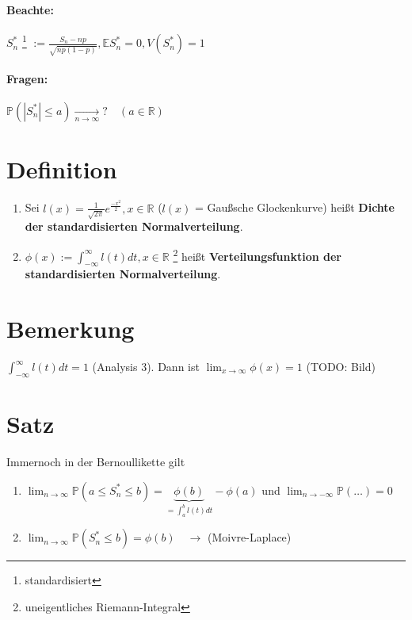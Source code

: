 \documentclass[a4paper,11pt,notitlepage]{report}
\newcommand{\R}{{\ensuremath{\mathbb{R}}}}
\newcommand{\Prim}{{\ensuremath{\mathbb{P}}}}
\newcommand{\E}{{\ensuremath{\mathbb{E}}}}
\begin{document}
\paragraph{Beachte:}
$S_n^*$ \footnote{standardisiert} $:= \frac{S_n - np}{\sqrt{n p (1-p)}}, \E S_n^* = 0, V(S_n^*) = 1$

\paragraph{Fragen:}
$\Prim(|S_n^*| \leq a) \underset{n \rightarrow \infty}{\rightarrow} ? \quad (a \in \R)$

\section{Definition}
\begin{enumerate}
	\item Sei $l(x) = \frac{1}{\sqrt{2 \pi}} e^{\frac{-x^2}{2}}, x \in \R$ ($l(x)$ = Gaußsche Glockenkurve)
	\newline
	heißt \textbf{Dichte der standardisierten Normalverteilung}.
	\item $\phi(x) := \int_{-\infty}^{\infty}{l(t) d t}, x \in \R$ \footnote{uneigentliches Riemann-Integral} heißt \textbf{Verteilungsfunktion der standardisierten Normalverteilung}.
\end{enumerate}

\section*{Bemerkung}
$\int_{-\infty}^{\infty}{l(t) d t} = 1$ (Analysis 3).
\newline
Dann ist $\lim_{x \rightarrow \infty}{\phi(x)} = 1$
\newline
(TODO: Bild)

\section{Satz}
Immernoch in der Bernoullikette gilt
\begin{enumerate}
	\item $\lim_{n \rightarrow \infty}{\Prim(a \leq S_n^*\leq b)} = \underbrace{\phi(b)}_{= \int_a^b{l(t)dt}} - \phi(a)$ und $\lim_{n \rightarrow -\infty} {\Prim(\ldots)} = 0$
	\item  $\lim_{n \rightarrow \infty}{\Prim(S_n^*\leq b)} = \phi(b) \quad \rightarrow$ (Moivre-Laplace)
\end{enumerate}
\end{document}
